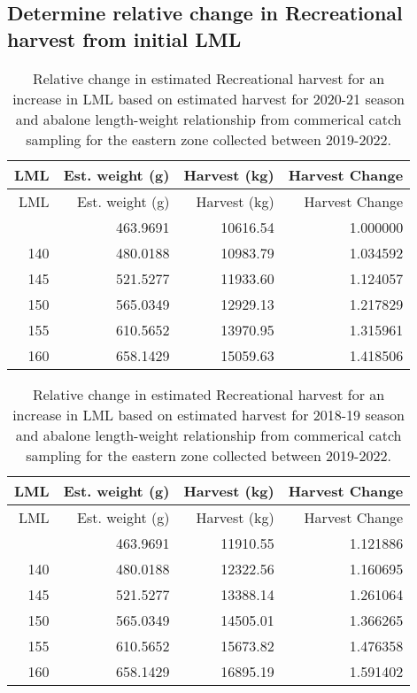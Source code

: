 \documentclass[
  11pt,
]{article}
\begin{document}
\subsection{Determine relative change in Recreational harvest from
initial
LML}\label{determine-relative-change-in-recreational-harvest-from-initial-lml}

\begin{longtable}[]{@{}rrrr@{}}
\caption{Relative change in estimated Recreational harvest for an
increase in LML based on estimated harvest for 2020-21 season and
abalone length-weight relationship from commerical catch sampling for
the eastern zone collected between 2019-2022.}\tabularnewline
\toprule\noalign{}
LML & Est. weight (g) & Harvest (kg) & Harvest Change \\
\midrule\noalign{}
\endfirsthead
\toprule\noalign{}
LML & Est. weight (g) & Harvest (kg) & Harvest Change \\
\midrule\noalign{}
\endhead
\bottomrule\noalign{}
\endlastfoot
138 & 463.9691 & 10616.54 & 1.000000 \\
140 & 480.0188 & 10983.79 & 1.034592 \\
145 & 521.5277 & 11933.60 & 1.124057 \\
150 & 565.0349 & 12929.13 & 1.217829 \\
155 & 610.5652 & 13970.95 & 1.315961 \\
160 & 658.1429 & 15059.63 & 1.418506 \\
\end{longtable}

\begin{longtable}[]{@{}rrrr@{}}
\caption{Relative change in estimated Recreational harvest for an
increase in LML based on estimated harvest for 2018-19 season and
abalone length-weight relationship from commerical catch sampling for
the eastern zone collected between 2019-2022.}\tabularnewline
\toprule\noalign{}
LML & Est. weight (g) & Harvest (kg) & Harvest Change \\
\midrule\noalign{}
\endfirsthead
\toprule\noalign{}
LML & Est. weight (g) & Harvest (kg) & Harvest Change \\
\midrule\noalign{}
\endhead
\bottomrule\noalign{}
\endlastfoot
138 & 463.9691 & 11910.55 & 1.121886 \\
140 & 480.0188 & 12322.56 & 1.160695 \\
145 & 521.5277 & 13388.14 & 1.261064 \\
150 & 565.0349 & 14505.01 & 1.366265 \\
155 & 610.5652 & 15673.82 & 1.476358 \\
160 & 658.1429 & 16895.19 & 1.591402 \\
\end{longtable}
\end{document}

